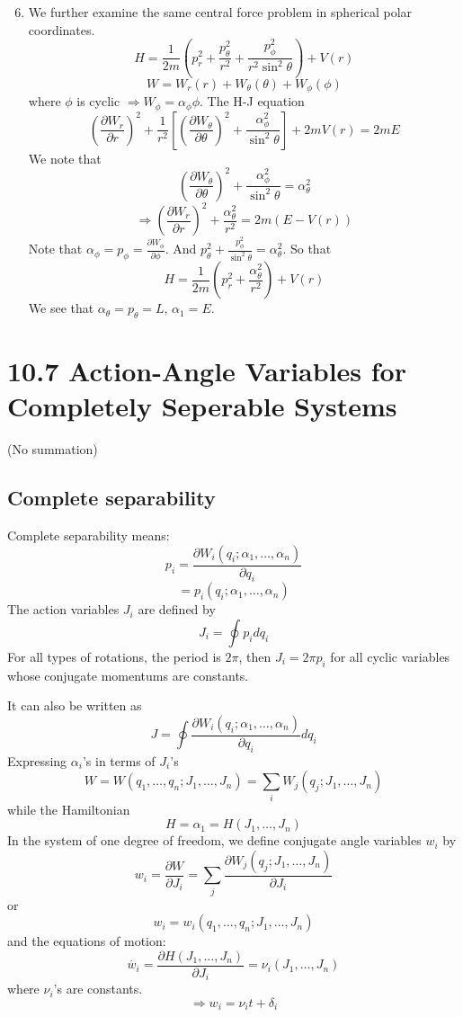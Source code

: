 \documentclass{article}
\begin{document}
	\begin{enumerate}
		\setcounter{enumi}{5}
		\item We further examine the same central force problem in spherical polar coordinates.
		\[ H = \frac{1}{2m} \left( p_r^2 + \frac{p_\theta^2}{r^2} + \frac{p_\phi^2}{r^2\sin^2\theta} \right) + V(r) \]
		\[ W = W_r(r) + W_\theta(\theta) + W_\phi(\phi) \]
		where $\phi$ is cyclic $\Rightarrow W_\phi = \alpha_\phi \phi$.
		The H-J equation
		\[ \left(\frac{\partial W_r}{\partial r}\right)^2 + \frac{1}{r^2}\left[ \left(\frac{\partial W_\theta}{\partial \theta}\right)^2 + \frac{\alpha_\phi^2}{\sin^2\theta} \right] + 2mV(r) = 2mE \]
		We note that
		\[ \left(\frac{\partial W_\theta}{\partial \theta}\right)^2 + \frac{\alpha_\phi^2}{\sin^2\theta} = \alpha_\theta^2 \]
		\[ \Rightarrow \left(\frac{\partial W_r}{\partial r}\right)^2 + \frac{\alpha_\theta^2}{r^2} = 2m(E-V(r)) \]
		Note that $\alpha_\phi = p_\phi = \frac{\partial W_\phi}{\partial \phi}$. And $p_\theta^2 + \frac{p_\phi^2}{\sin^2\theta} = \alpha_\theta^2$.
		So that
		\[ H = \frac{1}{2m} \left( p_r^2 + \frac{\alpha_\theta^2}{r^2} \right) + V(r) \]
		We see that $\alpha_\theta = p_\theta = L$, $\alpha_1 = E$.
	\end{enumerate}
	\section*{10.7 Action-Angle Variables for Completely Seperable Systems}
	(No summation)
	
	\subsection*{Complete separability}
	Complete separability means:
	\[ p_i = \frac{\partial W_i(q_i; \alpha_1, \dots, \alpha_n)}{\partial q_i} \]
	\[ = p_i(q_i; \alpha_1, \dots, \alpha_n) \]
	The action variables $J_i$ are defined by
	\[ J_i = \oint p_i dq_i \]
	For all types of rotations, the period is $2\pi$, then $J_i = 2\pi p_i$ for all cyclic variables whose conjugate momentums are constants.
	
	It can also be written as
	\[ J = \oint \frac{\partial W_i(q_i; \alpha_1, \dots, \alpha_n)}{\partial q_i} dq_i \]
	Expressing $\alpha_i$'s in terms of $J_i$'s
	\[ W = W(q_1, \dots, q_n; J_1, \dots, J_n) = \sum_i W_j(q_j; J_1, \dots, J_n) \]
	while the Hamiltonian
	\[ H = \alpha_1 = H(J_1, \dots, J_n) \]
	In the system of one degree of freedom, we define conjugate angle variables $w_i$ by
	\[ w_i = \frac{\partial W}{\partial J_i} = \sum_j \frac{\partial W_j(q_j; J_1, \dots, J_n)}{\partial J_i} \]
	or
	\[ w_i = w_i(q_1, \dots, q_n; J_1, \dots, J_n) \]
	and the equations of motion:
	\[ \dot{w_i} = \frac{\partial H(J_1, \dots, J_n)}{\partial J_i} = \nu_i(J_1, \dots, J_n) \]
	where $\nu_i$'s are constants.
	\[ \Rightarrow w_i = \nu_i t + \delta_i \]
	
\end{document}

